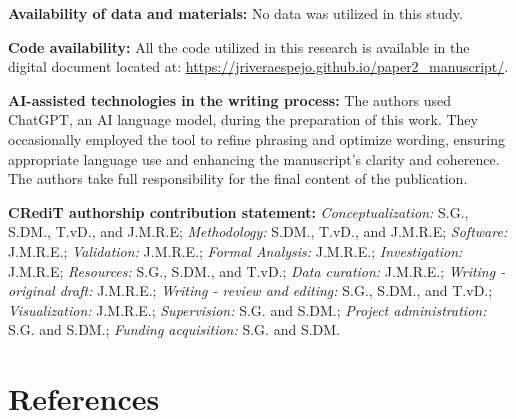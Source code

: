 \documentclass[
  authoryear,
  preprint,
  1p]{elsarticle}
\begin{document}
\textbf{Availability of data and materials:} No data was utilized in
this study.

\textbf{Code availability:} All the code utilized in this research is
available in the digital document located at:
\url{https://jriveraespejo.github.io/paper2_manuscript/}.

\textbf{AI-assisted technologies in the writing process:} The authors
used ChatGPT, an AI language model, during the preparation of this work.
They occasionally employed the tool to refine phrasing and optimize
wording, ensuring appropriate language use and enhancing the
manuscript's clarity and coherence. The authors take full responsibility
for the final content of the publication.

\textbf{CRediT authorship contribution statement:}
\emph{Conceptualization:} S.G., S.DM., T.vD., and J.M.R.E;
\emph{Methodology:} S.DM., T.vD., and J.M.R.E; \emph{Software:}
J.M.R.E.; \emph{Validation:} J.M.R.E.; \emph{Formal Analysis:} J.M.R.E.;
\emph{Investigation:} J.M.R.E; \emph{Resources:} S.G., S.DM., and T.vD.;
\emph{Data curation:} J.M.R.E.; \emph{Writing - original draft:}
J.M.R.E.; \emph{Writing - review and editing:} S.G., S.DM., and T.vD.;
\emph{Visualization:} J.M.R.E.; \emph{Supervision:} S.G. and S.DM.;
\emph{Project administration:} S.G. and S.DM.; \emph{Funding
acquisition:} S.G. and S.DM.

\newpage{}

\section*{References}\label{references}

\renewcommand{\bibsection}{}

\end{document}
